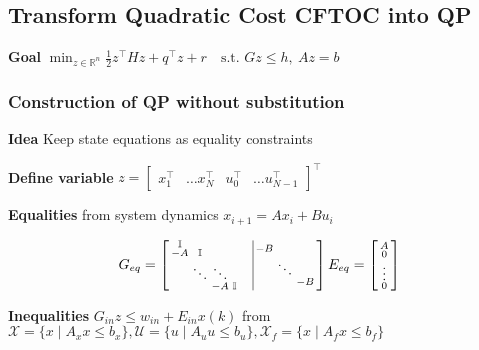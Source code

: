 \subsection{Transform Quadratic Cost CFTOC into QP}

\textbf{Goal}
$\min_{z\in\mathbb{R}^n}
	\textstyle\frac{1}{2}z^\top H z + q^\top z + r
	\quad\text{s.t. }Gz\leq h,\ Az = b$


\subsubsection{Construction of QP without substitution}

\textbf{Idea} Keep state equations as equality constraints

\textbf{Define variable} $z =
	\begin{bmatrix}
		x_1^\top & \dots x_N^\top & u_0^\top & \dots u_{N-1}^\top
	\end{bmatrix}^\top$

\textbf{Equalities} from system dynamics
$x_{i+1} = Ax_i + Bu_i$

\[
	G_{eq} =
	\begin{bmatrix}
		\begin{smallmatrix}
			\mathbb{I}& & & \\
			-A & \mathbb{I} && \\
			&  \ddots & \ddots \\
			&&-A & \mathbb{I}
		\end{smallmatrix}
		 & \vline
		\begin{smallmatrix}
			-B \\
			& \ddots \\
			& &-B
		\end{smallmatrix}
	\end{bmatrix}
	E_{eq} =
	\begin{bsmallmatrix}
		A      \\
		0      \\
		\vdots \\
		0
	\end{bsmallmatrix}
\]

\textbf{Inequalities}
$G_{in}z \leq w_{in} + E_{in}x(k)$ from
$\mathcal{X}   = \{x \mid A_x x \leq b_x\},
	\mathcal{U}   = \{u \mid A_u u \leq b_u\},
	\mathcal{X}_f = \{x \mid A_f x \leq b_f\}$

